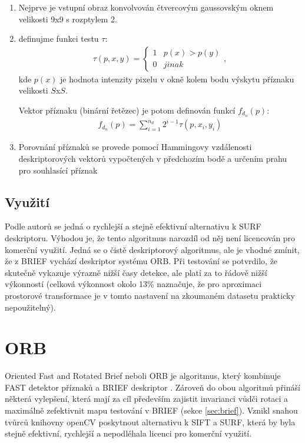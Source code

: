 		\begin{enumerate}
		\item Nejprve je vstupní obraz konvolvován čtvercovým gaussovským oknem velikosti 9x9 s rozptylem 2.
		\item definujme funkci testu $\tau$:
			\begin{align}
			\tau(p,x,y) = 
			\begin{cases}
			1 & p(x)>p(y) \\
			0 & jinak
			\end{cases}, 
			\end{align}
		kde $p(x)$ je hodnota intenzity pixelu v okně kolem bodu výskytu příznaku velikosti $S$x$S$. 
		
		Vektor příznaku (binární řetězec) je potom definován funkcí $f_{d_n}(p)$:
		\begin{align}
		f_{d_n}(p) = \sum_{i=1}^{n_d} 2^{i-1} \tau(p, x_i, y_i)
		\end{align}
		\item Porovnání příznaků se provede pomocí Hammingovy vzdálenosti deskriptorových vektorů vypočtených v předchozím bodě a určením prahu pro souhlasící příznak
		\end{enumerate}
	
	\subsection{Využití}
	
			Podle autorů se jedná o rychlejší a stejně efektivní alternativu k SURF deskriptoru. Výhodou je, že tento algoritmus narozdíl od něj není licencován pro komerční využití. Jedná se o čistě deskriptorový algoritmus, ale je vhodné zmínit, že z BRIEF vychází deskriptor systému ORB. Při testování se potvrdilo, že skutečně vykazuje výrazně nižší časy detekce, ale platí za to řádově nižší výkonností (celková výkonnost okolo 13\% naznačuje, že pro aproximaci prostorové transformace je v tomto nastavení na zkoumaném datasetu prakticky nepoužitelný).
	
\section{ORB}
\label{sec:orb}
Oriented Fast and Rotated Brief neboli ORB je algoritmus, který kombinuje FAST detektor příznaků a BRIEF deskriptor \cite{rublee2011orb}. Zároveň do obou algoritmů přináší některá vylepšení, která mají za cíl především zajistit invarianci vůdči rotaci a maximálně zefektivnit mapu testování v BRIEF (sekce \ref{sec:brief}). Vznikl snahou tvůrců knihovny openCV poskytnout alternativu k SIFT a SURF, která by byla stejně efektivní, rychlejší a nepodléhala licenci pro komerční využití.

